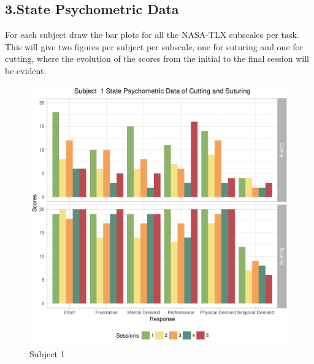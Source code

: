 \documentclass[12pt,epsf]{report}
\begin{document}
{\subsection*{3.State Psychometric Data}
For each subject draw the bar plots for all the NASA-TLX subscales per task. This will give two figures per subject per subscale, one for suturing and one for cutting, where the evolution of the scores from the initial to the final session will be evident. \\
\begin{figure}[!htb]
	\begin{minipage}[c]{0.5\linewidth}
	\includegraphics[width=\linewidth]{subject01_State_Psychometric_Data_of_Cutting_and_Suturing.pdf}
	\caption{Subject 1 }
	\end{minipage}
	\hfill
	\begin{minipage}[c]{0.5\linewidth}

\end{minipage}
\end{figure}}
\end{document}
